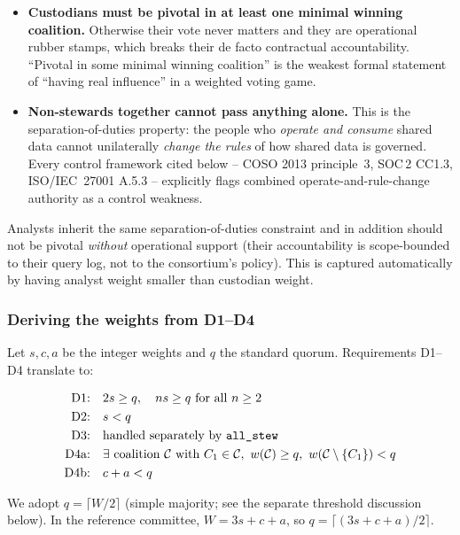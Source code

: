 \documentclass[10pt,twocolumn]{article}
\begin{document}
\begin{itemize}[leftmargin=*,topsep=1pt,itemsep=1pt]
\item \textbf{Custodians must be pivotal in at least one minimal
  winning coalition.} Otherwise their vote never matters and they
  are operational rubber stamps, which breaks their de facto
  contractual accountability. ``Pivotal in some minimal winning
  coalition'' is the weakest formal statement of ``having real
  influence'' in a weighted voting game.
\item \textbf{Non-stewards together cannot pass anything alone.}
  This is the separation-of-duties property: the people who
  \emph{operate and consume} shared data cannot unilaterally
  \emph{change the rules} of how shared data is governed. Every
  control framework cited below -- COSO 2013 principle~3, SOC\,2
  CC1.3, ISO/IEC~27001 A.5.3 -- explicitly flags combined
  operate-and-rule-change authority as a control weakness.
\end{itemize}

Analysts inherit the same separation-of-duties constraint and in
addition should not be pivotal \emph{without} operational support
(their accountability is scope-bounded to their query log, not to
the consortium's policy). This is captured automatically by having
analyst weight smaller than custodian weight.

\subsubsection{Deriving the weights from D1--D4}

Let $s,c,a$ be the integer weights and $q$ the standard quorum.
Requirements D1--D4 translate to:

\begin{align*}
\text{D1:} \quad & 2s \geq q, \quad ns \geq q \text{ for all } n\geq 2\\
\text{D2:} \quad & s < q \\
\text{D3:} \quad & \text{handled separately by \texttt{all\_stew}} \\
\text{D4a:} \quad & \exists \text{ coalition } \mathcal{C} \text{ with }
  C_1 \in \mathcal{C},\ w(\mathcal{C}) \geq q,\ w(\mathcal{C}\setminus\{C_1\}) < q \\
\text{D4b:} \quad & c + a < q
\end{align*}

We adopt $q = \lceil W/2 \rceil$ (simple majority; see the separate
threshold discussion below). In the reference committee,
$W = 3s + c + a$, so $q = \lceil (3s+c+a)/2 \rceil$.
\end{document}
